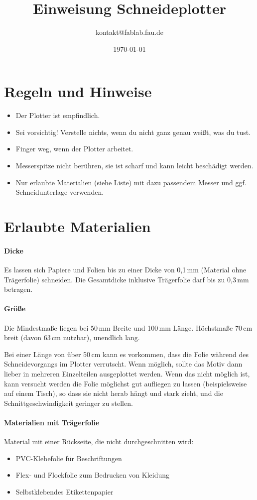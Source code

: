 \documentclass{\basedir/fablab-document}
\date{\today}
\author{kontakt@fablab.fau.de}
\title{Einweisung Schneideplotter}
\begin{document}
\maketitle
\section{Regeln und Hinweise}
\begin{itemize}
 \item Der Plotter ist empfindlich.
 \item Sei vorsichtig! Verstelle nichts, wenn du nicht ganz genau weißt, was du tust.
 \item Finger weg, wenn der Plotter arbeitet.
 \item Messerspitze nicht berühren, sie ist scharf und kann leicht beschädigt werden.
 \item Nur erlaubte Materialien (siehe Liste) mit dazu passendem Messer und ggf. Schneidunterlage verwenden.
\end{itemize}

\section{Erlaubte Materialien}
\paragraph{Dicke}
Es lassen sich Papiere und Folien bis zu einer Dicke von 0,1\,mm (Material ohne Trägerfolie) schneiden.
Die Gesamtdicke inklusive Trägerfolie darf bis zu 0,3\,mm betragen.

\paragraph{Größe}
Die Mindestmaße liegen bei 50\,mm Breite und 100\,mm Länge.
Höchstmaße 70\,cm breit (davon 63\,cm nutzbar), unendlich lang.

Bei einer Länge von über 50\,cm kann es vorkommen, dass die Folie während des Schneidevorgangs im Plotter verrutscht.
Wenn möglich, sollte das Motiv dann lieber in mehreren Einzelteilen ausgeplottet werden.
Wenn das nicht möglich ist, kann versucht werden die Folie möglichst gut aufliegen zu lassen (beispielsweise auf einem Tisch), so dass sie nicht herab hängt und stark zieht, und die Schnittgeschwindigkeit geringer zu stellen.


\paragraph{Materialien mit Trägerfolie}
Material mit einer Rückseite, die nicht durchgeschnitten wird:
\begin{itemize}
 \item PVC-Klebefolie für Beschriftungen
 \item Flex- und Flockfolie zum Bedrucken von Kleidung
 \item Selbstklebendes Etikettenpapier
\end{itemize}
\end{document}
